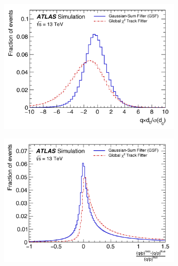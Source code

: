 \begin{figure}[t]
\centering
    \begin{subfigure}[b]{0.49\textwidth}
      \centering
      \includegraphics[width=1.0\textwidth]{figs/egamma/qd0.png}
      \caption{}
      \label{fig:egamma:qd0GSF}
    \end{subfigure}
    \hfill
    \begin{subfigure}[b]{0.49\textwidth}
      \centering
      \includegraphics[width=1.0\textwidth]{figs/egamma/qoverpGSF.png}
      \caption{}
      \label{fig:egamma:qoverpGSF}
    \end{subfigure}
     \centering
     \caption[]{ \cite{Aaboud:2019ynx}}
  \label{fig:egamma:GSF}
\end{figure}

